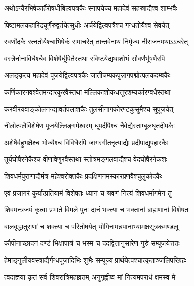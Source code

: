 \twolineshloka
{अथो\footnotemark{}ऽन्यैरभिषेकार्हैरोषधीबिल्वपत्रकैः}
{स्नापयेच्च महादेवं सहस्राद्यैश्व शाम्भवैः} %

\twolineshloka
{पिष्टामलकहारिद्रचूर्णैरुद्वर्तयेत्सुधीः}
{अर्चयेद्विल्वपत्रैश्च गन्धतोयैश्व सेवयेत्} %

\twolineshloka
{स्वर्णोदकै रत्नतोयैश्चाभिषेकं समाचरेत्}
{तान्तवेनाथ निर्मृज्य नीराजनमथाऽऽचरेत्} %

\twolineshloka
{वस्त्रैर्नानाविधैश्चैव विशेषैर्धूपितैस्तथा}
{संवेष्टयेद्यथाशोभं सौवर्णैर्भूषणैरपि} %

\twolineshloka
{अलङ्कृत्य महादेवं पूजयेद्विल्वपत्रकैः}
{जातीचम्पकपुन्नागपद्मोत्पलकदम्बकैः} %

\twolineshloka
{कर्णिकारनवश्वेतमन्दारकुरवैस्तथा}
{मल्लिकाशोकधत्तूरशम्यर्कारग्वधैस्तथा} %

\twolineshloka
{करवीरयवाङ्कोलनन्द्यावर्तपलाशकैः}
{तुलसीनागकोरण्टकुसुमैश्च सुपूजयेत्} %

\twolineshloka
{नीलोत्पलैर्विशेषेण पूजयेल्लिङ्गमेश्वरम्}
{धूपदीपैश्च नैवेद्यैस्ताम्बूलघृतदीपकैः} %

\twolineshloka
{अशेषैर्बहुभक्षैश्च भोज्यैश्च विविधैरपि}
{जागरगीतनृत्याद्यैः प्रदीपाद्युपहारकैः} %

\twolineshloka
{तूर्यघोषैरनेकैश्च वीणावेणुरवैस्तथा}
{स्तोत्रमङ्गलवाद्यैश्च वेदघोषैरनेकशः} %

\twolineshloka
{शिवधर्मपुराणाद्यैर्मत्र महेश्वरोक्तकैः}
{प्रदक्षिणनमस्कारप्रणवैश्चुलुकोदकैः} %


\twolineshloka
{एवं\footnotemark{} प्रजागरं कुर्यात्प्रतियामं विशेषतः}
{ध्यानं च श्रवणं नित्यं शिवधर्मागमेन तु} %


\twolineshloka
{शिवमन्त्रजपं कृत्वा प्रभाते विमले पुनः }
{दानं भक्त्या\footnotemark{} च भक्तानां ब्राह्मणानां विशेषतः} %


\twolineshloka
{बालवृद्धातुराणां च शक्त्या च परितोषयेत्}
{योगिनामन्नपानाभ्यामक्षसूत्रकमण्डलू} %

\twolineshloka
{कौपीनाच्छादनं दण्डं भिक्षापात्रं च भस्म च}
{ददद्वित्तानुसारेण गुरुं सम्पूजयेत्ततः} %

\twolineshloka
{हेमाङ्गुलीयवस्त्राद्यैर्गन्धपूजा\footnotemark{}दिभिः शुभैः}
{सम्पूज्य प्रार्थयेत्पश्चात्कृताञ्जलिपरिग्रहः} %


\twolineshloka
{त्वदाज्ञया कृतं सर्व शिवरात्रिमहाव्रतम्}
{अनुगृह्णीष्व मां नित्यमपराधं क्षमस्व मे} %

